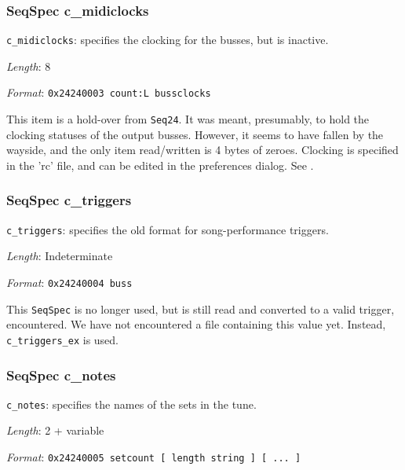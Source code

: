 \subsubsection{SeqSpec c\_midiclocks}
\label{subsubsec:midi_format_track_seqspec_midiclocks}

   \begin{description}
      \item \texttt{c\_midiclocks}: specifies the clocking for the busses, but is inactive.
      \item \textsl{Length}: 8
      \item \textsl{Format}: \texttt{0x24240003 count:L bussclocks}
   \end{description}

   This item is a hold-over from \texttt{Seq24}.  It was meant, presumably, to
   hold the clocking statuses of the output busses.  However, it seems to have
   fallen by the wayside, and the only item read/written is 4 bytes of zeroes.
   Clocking is specified in the 'rc' file, and can be edited in the preferences
   dialog.
   See .

\subsubsection{SeqSpec c\_triggers}
\label{subsubsec:midi_format_track_seqspec_triggers}

   \begin{description}
      \item \texttt{c\_triggers}:
         specifies the old format for song-performance triggers.
      \item \textsl{Length}: Indeterminate
      \item \textsl{Format}: \texttt{0x24240004 buss}
   \end{description}

   This \texttt{SeqSpec} is no longer used, but is still read and
   converted to a valid trigger, encountered.
   We have not encountered a file containing this value yet.
   Instead, \texttt{c\_triggers\_ex} is used.

\subsubsection{SeqSpec c\_notes}
\label{subsubsec:midi_format_track_seqspec_notes}

   \begin{description}
      \item \texttt{c\_notes}: specifies the names of the sets in the tune.
      \item \textsl{Length}: 2 + variable
      \item \textsl{Format}: \texttt{0x24240005 setcount [ length string ] [ ... ] }
   \end{description}

